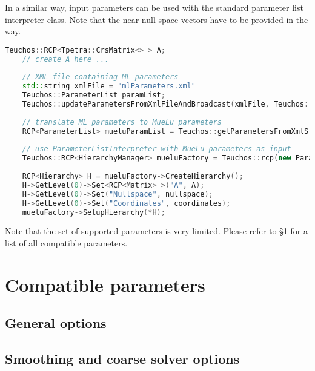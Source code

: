 In a similar way, \ml input parameters can be used with the standard \muelu parameter list interpreter class. Note that the near null space vectors have to be provided in the \muelu way.

\begin{lstlisting}[language=C++]
    Teuchos::RCP<Tpetra::CrsMatrix<> > A;
    // create A here ...
    
    // XML file containing ML parameters
    std::string xmlFile = "mlParameters.xml"
    Teuchos::ParameterList paramList;
    Teuchos::updateParametersFromXmlFileAndBroadcast(xmlFile, Teuchos::Ptr<Teuchos::ParameterList>(&paramList), *comm);
    
    // translate ML parameters to MueLu parameters
    RCP<ParameterList> mueluParamList = Teuchos::getParametersFromXmlString(MueLu::ML2MueLuParameterTranslator::translate(paramList,"SA"));
    
    // use ParameterListInterpreter with MueLu parameters as input
    Teuchos::RCP<HierarchyManager> mueluFactory = Teuchos::rcp(new ParameterListInterpreter(*mueluParamList));
    
    RCP<Hierarchy> H = mueluFactory->CreateHierarchy();
    H->GetLevel(0)->Set<RCP<Matrix> >("A", A);
    H->GetLevel(0)->Set("Nullspace", nullspace);
    H->GetLevel(0)->Set("Coordinates", coordinates);
    mueluFactory->SetupHierarchy(*H);
\end{lstlisting}

Note that the set of supported \ml parameters is very limited. Please refer to \S\ref{sec:compatiblemlparameters} for a list of all compatible \ml parameters.

\section{Compatible \ml parameters}
\label{sec:compatiblemlparameters}
\subsection{General \ml options}


\subsection{Smoothing and coarse solver options}


